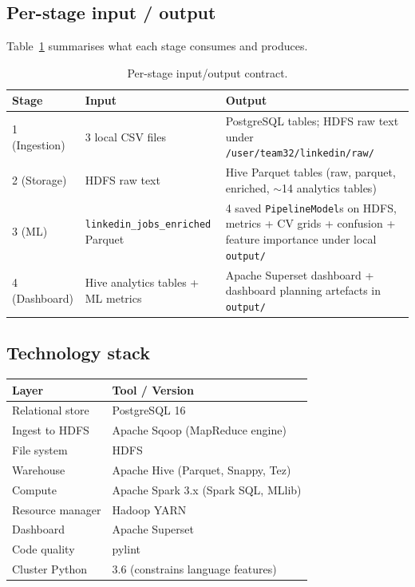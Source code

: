 \documentclass[11pt,a4paper]{article}
\begin{document}
\subsection{Per-stage input / output}
Table~\ref{tab:stages} summarises what each stage consumes and
produces.

\begin{table}[h]
\centering
\caption{Per-stage input/output contract.}
\label{tab:stages}
\small
\begin{tabularx}{\linewidth}{l X X}
\toprule
\textbf{Stage} & \textbf{Input} & \textbf{Output} \\
\midrule
1 (Ingestion) & 3 local CSV files & PostgreSQL tables; HDFS raw text under \texttt{/user/team32/linkedin/raw/} \\
2 (Storage)   & HDFS raw text     & Hive Parquet tables (raw, parquet, enriched, $\sim$14 analytics tables) \\
3 (ML)        & \texttt{linkedin\_jobs\_enriched} Parquet & 4 saved \texttt{PipelineModel}s on HDFS, metrics + CV grids + confusion + feature importance under local \texttt{output/} \\
4 (Dashboard) & Hive analytics tables + ML metrics & Apache Superset dashboard + dashboard planning artefacts in \texttt{output/} \\
\bottomrule
\end{tabularx}
\end{table}

\subsection{Technology stack}
\begin{center}
\small
\begin{tabular}{l l}
\toprule
\textbf{Layer} & \textbf{Tool / Version} \\
\midrule
Relational store   & PostgreSQL 16 \\
Ingest to HDFS     & Apache Sqoop (MapReduce engine) \\
File system        & HDFS \\
Warehouse          & Apache Hive (Parquet, Snappy, Tez) \\
Compute            & Apache Spark 3.x (Spark SQL, MLlib) \\
Resource manager   & Hadoop YARN \\
Dashboard          & Apache Superset \\
Code quality       & pylint \\
Cluster Python     & 3.6 (constrains language features) \\
\bottomrule
\end{tabular}
\end{center}
\end{document}
